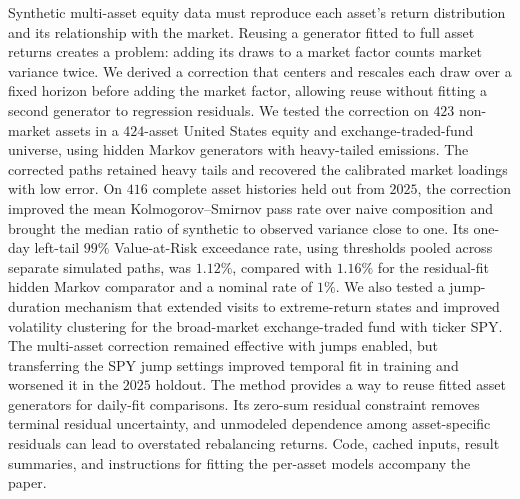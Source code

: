 Synthetic multi-asset equity data must reproduce each asset's return
distribution and its relationship with the market. Reusing a generator
fitted to full asset returns creates a problem: adding its draws to a
market factor counts market variance twice. We derived a correction
that centers and rescales each draw over a fixed horizon before adding
the market factor,
allowing reuse without fitting a second generator to regression
residuals. We tested the correction on $423$ non-market assets in a
$424$-asset United States equity and exchange-traded-fund universe,
using hidden Markov generators with heavy-tailed emissions. The
corrected paths retained heavy tails and recovered the calibrated
market loadings with low error. On $416$ complete asset histories held
out from $2025$, the correction improved the mean Kolmogorov--Smirnov
pass rate over naive composition and brought the median ratio of
synthetic to observed variance close to one. Its one-day left-tail
$99\%$ Value-at-Risk exceedance rate, using thresholds pooled across
separate simulated paths, was $1.12\%$, compared with $1.16\%$ for
the residual-fit hidden Markov comparator and a nominal rate of
$1\%$. We also
tested a jump-duration mechanism that extended visits to extreme-return
states and improved volatility clustering for the broad-market
exchange-traded fund with ticker SPY. The multi-asset correction
remained effective with jumps enabled, but transferring the SPY jump
settings improved temporal fit in training and worsened it in the
$2025$ holdout. The method provides a way to reuse fitted asset
generators for daily-fit comparisons. Its zero-sum residual constraint
removes terminal residual uncertainty, and unmodeled dependence among
asset-specific residuals can lead to overstated rebalancing returns. Code,
cached inputs, result summaries, and instructions for fitting the
per-asset models accompany the paper.
